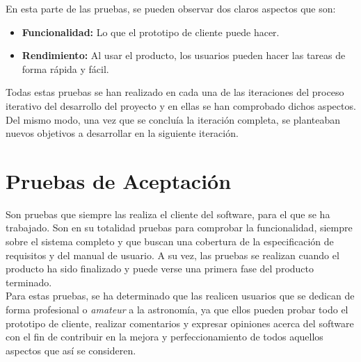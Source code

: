 En esta parte de las pruebas, se pueden observar dos claros aspectos que son:
\begin{itemize}
  \item \textbf{Funcionalidad:} Lo que el prototipo de cliente puede hacer.
  \item \textbf{Rendimiento:} Al usar el producto, los usuarios pueden hacer las tareas de forma rápida y fácil.
\end{itemize}
Todas estas pruebas se han realizado en cada una de las iteraciones del proceso iterativo del desarrollo del proyecto y en ellas se han comprobado dichos aspectos. Del mismo modo, una vez que se concluía  la iteración completa, se planteaban nuevos objetivos a desarrollar en la siguiente iteración.

\section{Pruebas de Aceptación}
Son pruebas que siempre las realiza el cliente del software, para el que se ha trabajado.
Son en su totalidad pruebas para comprobar la funcionalidad, siempre sobre el sistema completo y que buscan una cobertura de la especificación de requisitos y del manual de usuario. A su vez, las pruebas se realizan cuando el producto ha sido finalizado y puede verse una primera fase del producto terminado.\\

Para estas pruebas, se ha determinado que las realicen usuarios que se dedican de forma profesional o \textit{amateur} a la astronomía, ya que ellos pueden probar todo el prototipo de cliente, realizar comentarios y expresar opiniones acerca del software con el fin de contribuir en la mejora y perfeccionamiento de todos aquellos aspectos que así se consideren. \\
